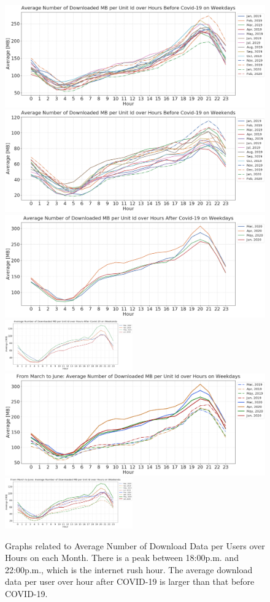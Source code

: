 \begin{figure}[t]
  \centering
  \includegraphics[width=.49\textwidth]{figs/wenjun/download_wdays_before.png}
  \includegraphics[width=.49\textwidth]{figs/wenjun/download_wends_before.png}
  \includegraphics[width=.49\textwidth]{figs/wenjun/download_wdays_after.png}
  \includegraphics[width=0.49\textwidth]{figs/wenjun/download_wends_after.png}
  \includegraphics[width=.49\textwidth]{figs/wenjun/download_wdays_compare_36.png}
  \includegraphics[width=0.49\textwidth]{figs/wenjun/download_wends_compare_36.png}

  \caption{Graphs related to Average Number of Download Data per Users over Hours on each Month. There is a peak between 18:00p.m. and 22:00p.m., which is the internet rush hour. The average download data per user over hour after COVID-19 is larger than that before COVID-19.}

  \label{fig:download-data-per-user-hours-fig}
\end{figure}

